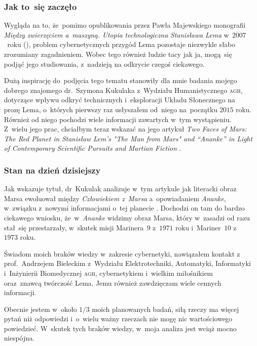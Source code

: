 \documentclass[10pt,t]{beamer}
\begin{document}
\begin{frame}
  \frametitle{Jak to~się zaczęło}


  Wygląda na to, że~pomimo opublikowania przez Pawła Majewskiego monografii
  \textit{Między zwierzęciem a~maszyną. Utopia technologiczna Stanisława
    Lema} w~$2007$~roku
  (\parencite{Majewski-Miedzy-zwierzeciem-a-maszyna-ETC-Pub-2007}), problem
  cybernetycznych przygód Lema pozostaje niezwykle słabo zrozumiany
  zagadnieniem. Wobec tego również ludzie tacy jak ja, mogą~się podjąć jego
  studiowania, z~nadzieją na odkrycie czegoś ciekawego.

  Dużą inspirację do~podjęcia tego tematu stanowiły dla mnie badania
  mojego dobrego znajomego
  {dr.~Szymona Kukulaka} z~Wydziału Humanistycznego \textsc{agh}, dotyczące
  wpływu odkryć technicznych i~eksploracji Układu Słonecznego na prozę
  Lema, o~których pierwszy raz usłyszałem od~niego na~początku $2015$ roku.
  Również od niego pochodzi wiele informacji zawartych w~tym wystąpieniu.
  Z~wielu jego prac, chciałbym teraz wskazać na jego artykuł \textit{Two
    Faces of Mars: The Red Planet in Stanisław Lem's "The Man from Mars" and
    “Ananke” in Light of Contemporary Scientific Pursuits and Martian
    Fiction} \parencite{Kukulak-Two-Faces-of-Mars-Pub-2023}.

\end{frame}





\begin{frame}
  \frametitle{Stan na dzień dzisiejszy}


  Jak wskazuje tytuł, dr~Kukulak analizuje w~tym artykule jak literacki
  obraz Marsa ewoluował między \textit{Człowiekiem z~Marsa} a~opowiadaniem
  \textit{Ananke}, w~związku z~nowymi informacjami o~tej planecie
  \parencite{Kukulak-Two-Faces-of-Mars-Pub-2023}. Dochodzi on tam do bardzo
  ciekawego wniosku, że~w~\textit{Ananke} widzimy obraz Marsa, który
  w~zasadzi od razu stał~się przestarzały, w~skutek misji Marinera~$9$
  z~$1971$ roku i~Mariner~$10$ z~$1973$ roku.

  Świadom moich braków wiedzy w~zakresie cybernetyki, nawiązałem kontakt
  z~
  {prof.~Andrzejem Bieleckim} z~Wydziału Elektrotechniki, Automatyki,
  Informatyki i~Inżynierii Biomedycznej \textsc{agh}, cybernetykiem
  i~wielkim miłośnikiem oraz~znawcą twórczość Lema. Jemu również zawdzięczam
  wiele cennych informacji.

  Obecnie jestem w~około $1 / 3$ moich planowanych badań, siłą rzeczy
  ma więcej pytań niż odpowiedzi i~o~wielu ważny rzeczach nie mogę nic
  wartościowego powiedzieć. W~skutek tych braków wiedzy, w~moja analiza
  jest wciąż mocno niespójna.

\end{frame}
\end{document}
